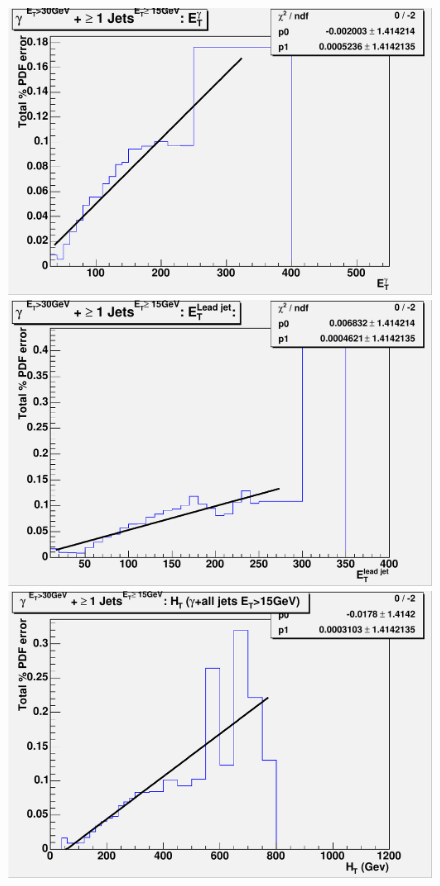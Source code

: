 \begin{figure}[p]
 \centering
 \includegraphics[scale=0.36,keepaspectratio=true]{PDFsyst_pj1_Et_pho.pdf}\hspace{2ex}
 \includegraphics[scale=0.36,keepaspectratio=true]{PDFsyst_pj1_Et_leadjet.pdf}
\\[2ex]
 \includegraphics[scale=0.36,keepaspectratio=true]{PDFsyst_pj1_Ht.pdf}\hspace{2ex}

\end{figure}
